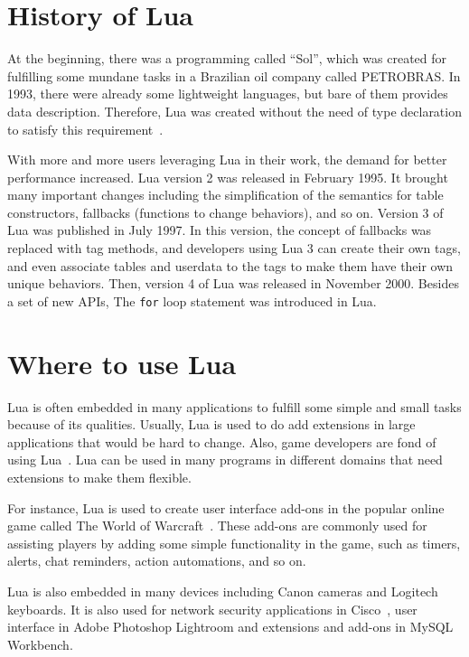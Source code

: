 \section{History of Lua}
At the beginning, there was a programming called ``Sol'', which was created for fulfilling some mundane tasks in a Brazilian oil company called PETROBRAS. In 1993, there were already some lightweight languages, but
bare of them
provides data description. Therefore, Lua was created without the need of type declaration to satisfy this requirement~\cite{EOL}.

With more and more users leveraging Lua in their work, the demand for better performance increased. Lua version 2 was released in February 1995. It brought many important changes including the simplification of the semantics for table constructors,
fallbacks (functions to change behaviors), and so on. Version 3 of Lua was published in July 1997. In this version, the concept of fallbacks was replaced with tag methods, and developers using Lua 3 can create their own tags, and even associate tables and userdata to the tags to make them have their own unique behaviors. Then, version 4 of Lua was released in November 2000. Besides a set of new APIs, The {\tt for} loop statement was introduced in Lua.

\section{Where to use Lua}
Lua is often embedded in many applications to fulfill some simple and small tasks because of its qualities. Usually, Lua is used to do add extensions in large applications that would be hard to change. Also, game developers are fond of using Lua~\cite{AIL}. Lua can be used in many programs in different domains that need extensions to make them flexible. 

For instance, Lua is used to create user interface add-ons in the popular online game called The World of Warcraft~\cite{WLA}. These add-ons are commonly used for assisting players by adding some simple functionality in the game, such as timers, alerts, chat reminders, action automations, and so on.

Lua is also embedded in many devices including Canon cameras and Logitech keyboards. It is also used for network security applications in Cisco~\cite{CISCO}, user interface in Adobe Photoshop Lightroom and extensions and add-ons in MySQL Workbench.

